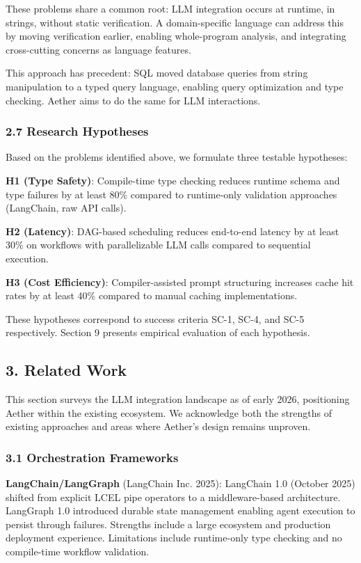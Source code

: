 \documentclass[
]{article}
\begin{document}
These problems share a common root: LLM integration occurs at runtime,
in strings, without static verification. A domain-specific language can
address this by moving verification earlier, enabling whole-program
analysis, and integrating cross-cutting concerns as language features.

This approach has precedent: SQL moved database queries from string
manipulation to a typed query language, enabling query optimization and
type checking. Aether aims to do the same for LLM interactions.

\subsubsection{2.7 Research Hypotheses}\label{research-hypotheses}

Based on the problems identified above, we formulate three testable
hypotheses:

\textbf{H1 (Type Safety)}: Compile-time type checking reduces runtime
schema and type failures by at least 80\% compared to runtime-only
validation approaches (LangChain, raw API calls).

\textbf{H2 (Latency)}: DAG-based scheduling reduces end-to-end latency
by at least 30\% on workflows with parallelizable LLM calls compared to
sequential execution.

\textbf{H3 (Cost Efficiency)}: Compiler-assisted prompt structuring
increases cache hit rates by at least 40\% compared to manual caching
implementations.

These hypotheses correspond to success criteria SC-1, SC-4, and SC-5
respectively. Section 9 presents empirical evaluation of each
hypothesis.

\subsection{3. Related Work}\label{related-work}

This section surveys the LLM integration landscape as of early 2026,
positioning Aether within the existing ecosystem. We acknowledge both
the strengths of existing approaches and areas where Aether's design
remains unproven.

\subsubsection{3.1 Orchestration
Frameworks}\label{orchestration-frameworks}

\textbf{LangChain/LangGraph} (LangChain Inc. 2025): LangChain 1.0
(October 2025) shifted from explicit LCEL pipe operators to a
middleware-based architecture. LangGraph 1.0 introduced durable state
management enabling agent execution to persist through failures.
Strengths include a large ecosystem and production deployment
experience. Limitations include runtime-only type checking and no
compile-time workflow validation.
\end{document}
